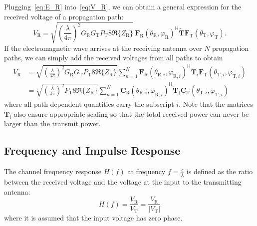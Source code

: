 Plugging~\eqref{eq:E_R} into~\eqref{eq:V_R}, we can obtain a general expression for the received voltage of a propagation path:
\begin{equation}
    V_\text{R} = \sqrt{\left(\frac{\lambda}{4\pi}\right)^2 G_\text{R}G_\text{T}P_\text{T} 8\Re\{Z_\text{R}\}} \,\mathbf{F}_\text{R}(\theta_\text{R}, \varphi_\text{R})^{\mathsf{H}}\widetilde{\mathbf{T}} \mathbf{F}_\text{T}(\theta_\text{T}, \varphi_\text{T}).
\end{equation}
If the electromagnetic wave arrives at the receiving antenna over $N$ propagation paths, we can simply add the received voltages from all paths to obtain
\begin{align}
    \label{eq:V_Rmulti}
    V_\text{R} &= \sqrt{\left(\frac{\lambda}{4\pi}\right)^2 G_\text{R}G_\text{T}P_\text{T} 8\Re\{Z_\text{R}\}} \sum_{n=1}^N\mathbf{F}_\text{R}(\theta_{\text{R},i}, \varphi_{\text{R},i})^{\mathsf{H}}\widetilde{\mathbf{T}}_i \mathbf{F}_\text{T}(\theta_{\text{T},i}, \varphi_{\text{T},i})\\
    &= \sqrt{\left(\frac{\lambda}{4\pi}\right)^2 P_\text{T} 8\Re\{Z_\text{R}\}} \sum_{n=1}^N\mathbf{C}_\text{R}(\theta_{\text{R},i}, \varphi_{\text{R},i})^{\mathsf{H}}\widetilde{\mathbf{T}}_i \mathbf{C}_\text{T}(\theta_{\text{T},i}, \varphi_{\text{T},i})
\end{align}
where all path-dependent quantities carry the subscript $i$. Note that the matrices $\widetilde{\mathbf{T}}_i$ also ensure appropriate scaling so that the total received power can never be larger than the transmit power.


\subsection{Frequency and Impulse Response}
\label{sec:primer-em-freq-ir}
The channel frequency response $H(f)$ at frequency $f=\frac{c}{\lambda}$ is defined as the ratio between the received voltage and the voltage at the input to the transmitting antenna:
\begin{equation}
    \label{eq:H}
    H(f) = \frac{V_\text{R}}{V_\text{T}} = \frac{V_\text{R}}{|V_\text{T}|}
\end{equation}
where it is assumed that the input voltage has zero phase.

